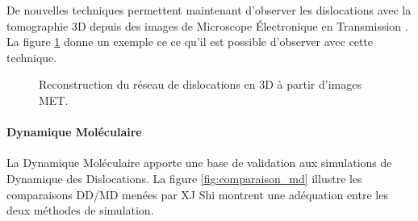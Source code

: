 \documentclass[11pt,class=article,float=false,crop=false]{standalone}
\begin{document}
De nouvelles techniques permettent maintenant d'observer les dislocations avec la tomographie 3D depuis des images de Microscope Électronique en Transmission  . La figure \ref{fig:tomo3d} donne un exemple ce ce qu'il est possible d'observer avec cette technique.

\begin{figure}[H]
	\centering
	\caption[Reconstruction du réseau de dislocations en 3D à partir d'images MET]{Reconstruction du réseau de dislocations en 3D à partir d'images MET.}
	\label{fig:tomo3d}
\end{figure}


\paragraph{Dynamique Moléculaire}

La Dynamique Moléculaire apporte une base de validation aux simulations de Dynamique des Dislocations. La figure \ref{fig:comparaison_md} illustre les comparaisons DD/MD menées par XJ Shi  montrent une adéquation entre les deux méthodes de simulation.
\end{document}

